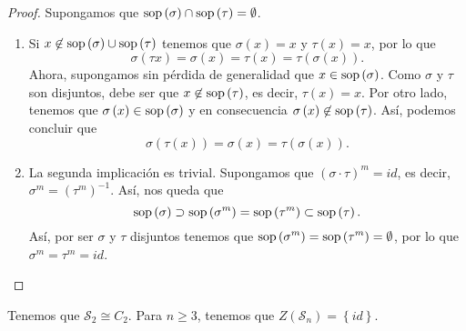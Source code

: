 \begin{proof} Supongamos que $\displaystyle \operatorname{sop}\left(\sigma \right) \cap \operatorname{sop}\left(\tau \right) = \emptyset $.
\begin{enumerate}
\item Si $\displaystyle x \not\in \operatorname{sop}\left(\sigma \right)\cup \operatorname{sop}\left(\tau \right) $ tenemos que $\displaystyle \sigma\left(x\right) = x $ y $\displaystyle \tau\left(x\right) = x $, por lo que
	\[\sigma\left(\tau x\right) = \sigma \left(x\right) = \tau\left(x\right) = \tau\left(\sigma\left(x\right)\right) .\]
	Ahora, supongamos sin pérdida de generalidad que $\displaystyle x \in \operatorname{sop}\left(\sigma \right) $. Como $\displaystyle \sigma  $ y $\displaystyle \tau $ son disjuntos, debe ser que $\displaystyle x \not\in \operatorname{sop}\left(\tau\right) $, es decir, $\displaystyle \tau\left(x\right) = x $. Por otro lado, tenemos que $\displaystyle \sigma\left(x\right) \in \operatorname{sop}\left(\sigma \right) $ y en consecuencia $\displaystyle \sigma\left(x\right) \not\in \operatorname{sop}\left(\tau\right) $. Así, podemos concluir que
	\[ \sigma\left(\tau\left(x\right)\right) = \sigma \left(x\right) = \tau\left(\sigma \left(x\right)\right) .\]
\item La segunda implicación es trivial. Supongamos que $\displaystyle \left(\sigma \cdot \tau\right)^{m} = id $, es decir, $\displaystyle \sigma^{m} = \left(\tau^{m}\right)^{-1} $. Así, nos queda que
	\[\operatorname{sop}\left(\sigma \right) \supset \operatorname{sop}\left(\sigma ^{m}\right) = \operatorname{sop}\left(\tau^{m}\right)\subset \operatorname{sop}\left(\tau\right) .\]
Así, por ser $\displaystyle \sigma  $ y $\displaystyle \tau $ disjuntos tenemos que $\displaystyle \operatorname{sop}\left(\sigma ^{m}\right) = \operatorname{sop}\left(\tau^{m}\right)= \emptyset $, por lo que $\displaystyle \sigma^{m} = \tau^{m} = id $.	
\end{enumerate}
\end{proof}
\begin{observation}
	Tenemos que $\displaystyle \mathcal{S}_{2} \cong C_{2} $. Para $\displaystyle n \geq 3 $, tenemos que $\displaystyle Z\left(\mathcal{S}_{n}\right) = \left\{ id\right\}  $. 
\end{observation}

